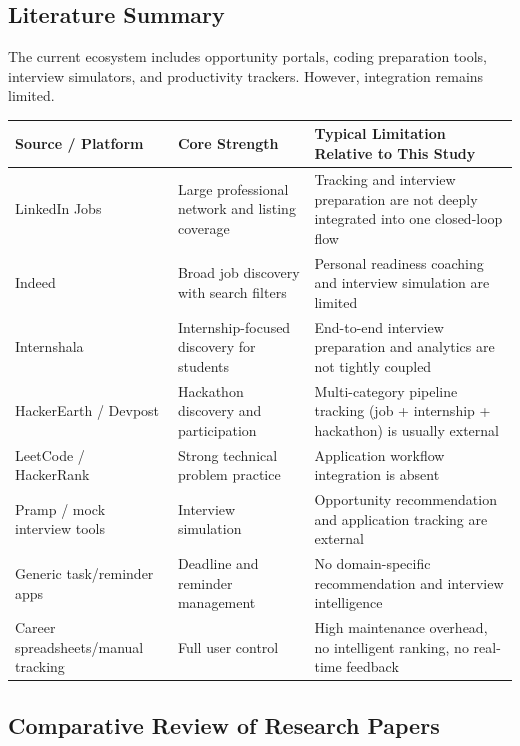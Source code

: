 \documentclass[conference]{IEEEtran}
\begin{document}
\subsection{Literature Summary}

The current ecosystem includes opportunity portals, coding preparation tools, interview simulators, and productivity trackers. However, integration remains limited.

\begin{table}[!tb]
\centering
\setlength{\tabcolsep}{4pt}
\normalsize
\begin{tabularx}{\textwidth}{|>{\RaggedRight\arraybackslash}X|>{\RaggedRight\arraybackslash}X|>{\RaggedRight\arraybackslash}X|}
\hline
 \textbf{Source / Platform} & \textbf{Core Strength} & \textbf{Typical Limitation Relative to This Study} \\
\hline
 LinkedIn Jobs & Large professional network and listing coverage & Tracking and interview preparation are not deeply integrated into one closed-loop flow \\
\hline
 Indeed & Broad job discovery with search filters & Personal readiness coaching and interview simulation are limited \\
\hline
 Internshala & Internship-focused discovery for students & End-to-end interview preparation and analytics are not tightly coupled \\
\hline
 HackerEarth / Devpost & Hackathon discovery and participation & Multi-category pipeline tracking (job + internship + hackathon) is usually external \\
\hline
 LeetCode / HackerRank & Strong technical problem practice & Application workflow integration is absent \\
\hline
 Pramp / mock interview tools & Interview simulation & Opportunity recommendation and application tracking are external \\
\hline
 Generic task/reminder apps & Deadline and reminder management & No domain-specific recommendation and interview intelligence \\
\hline
 Career spreadsheets/manual tracking & Full user control & High maintenance overhead, no intelligent ranking, no real-time feedback \\
\hline
\end{tabularx}
\end{table}

\subsection{Comparative Review of Research Papers}
\end{document}
